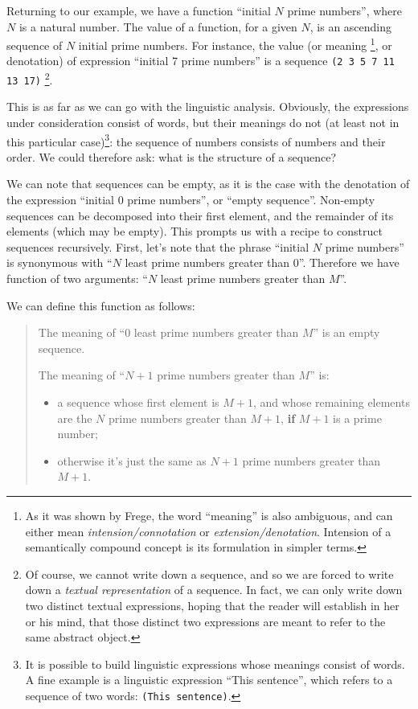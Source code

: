 Returning to our example, we have a function ``initial $N$
prime numbers'', where $N$ is a natural number. The value
of a function, for a given $N$, is an ascending sequence
of $N$ initial prime numbers. For instance, the value (or meaning
\footnote{As it was shown by Frege, the word ``meaning'' is also
ambiguous, and can either mean \textit{intension/connotation} or 
\textit{extension/denotation}.
Intension of a semantically compound concept is its formulation
in simpler terms.}, or denotation) of expression ``initial 7 
prime numbers'' is a sequence \texttt{(2 3 5 7 11 13 17)}
\footnote{Of course, we cannot write down a sequence, and so we are 
forced to write down a \textit{textual representation} of a sequence.
In fact, we can only write down two distinct textual expressions,
hoping that the reader will establish in her or his mind, that those
distinct two expressions are meant to refer to the same abstract
object.}.

This is as far as we can go with the linguistic analysis.
Obviously, the expressions under consideration consist of
words, but their meanings do not (at least not in this
particular case)\footnote{It is possible to build linguistic
expressions whose meanings consist of words. A fine example
is a linguistic expression ``This sentence'', which refers
to a sequence of two words: \texttt{(This sentence)}.}:
the sequence of numbers consists of numbers and their order.
We could therefore ask: what is the structure of a sequence?

We can note that sequences can be empty, as it is the case
with the denotation of the expression ``initial 0 prime numbers'',
or ``empty sequence''. Non-empty sequences can be decomposed
into their first element, and the remainder of its elements
(which may be empty). This prompts us with a recipe to construct
sequences recursively. First, let's note that the phrase
``initial $N$ prime numbers'' is synonymous with ``$N$ least
prime numbers greater than 0''. Therefore we have function
of two arguments: ``$N$ least prime numbers greater than $M$''.

We can define this function as follows:

\begin{quotation}
The meaning of ``$0$ least prime numbers greater than $M$''
is an empty sequence.

The meaning of ``$N+1$ prime numbers greater than $M$''
is:
\begin{itemize}
\item a sequence whose first element is $M+1$, and whose
remaining elements are the $N$ prime numbers greater
than $M+1$, \textbf{if} $M+1$ is a prime number;
\item otherwise it's just the same as $N+1$ prime numbers
greater than $M+1$.
\end{itemize}
\end{quotation}

